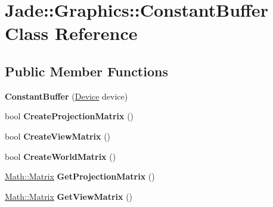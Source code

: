 \hypertarget{class_jade_1_1_graphics_1_1_constant_buffer}{}\section{Jade\+:\+:Graphics\+:\+:Constant\+Buffer Class Reference}
\label{class_jade_1_1_graphics_1_1_constant_buffer}
\subsection*{Public Member Functions}
\begin{DoxyCompactItemize}
\item 
\hypertarget{class_jade_1_1_graphics_1_1_constant_buffer_ada5823eabf51da0c466ab01f26909297}{}{\bfseries Constant\+Buffer} (\hyperlink{class_jade_1_1_graphics_1_1_device}{Device} device)\label{class_jade_1_1_graphics_1_1_constant_buffer_ada5823eabf51da0c466ab01f26909297}

\item 
\hypertarget{class_jade_1_1_graphics_1_1_constant_buffer_ae88123a27babd937c1454812d4a21cb5}{}bool {\bfseries Create\+Projection\+Matrix} ()\label{class_jade_1_1_graphics_1_1_constant_buffer_ae88123a27babd937c1454812d4a21cb5}

\item 
\hypertarget{class_jade_1_1_graphics_1_1_constant_buffer_a15679226ff228070271b91e44ae978c3}{}bool {\bfseries Create\+View\+Matrix} ()\label{class_jade_1_1_graphics_1_1_constant_buffer_a15679226ff228070271b91e44ae978c3}

\item 
\hypertarget{class_jade_1_1_graphics_1_1_constant_buffer_aa046e5121830fa71897c4e4805014ee6}{}bool {\bfseries Create\+World\+Matrix} ()\label{class_jade_1_1_graphics_1_1_constant_buffer_aa046e5121830fa71897c4e4805014ee6}

\item 
\hypertarget{class_jade_1_1_graphics_1_1_constant_buffer_a02b925d31d9a7ab4688afbf54918a740}{}\hyperlink{struct_jade_1_1_math_1_1_matrix}{Math\+::\+Matrix} {\bfseries Get\+Projection\+Matrix} ()\label{class_jade_1_1_graphics_1_1_constant_buffer_a02b925d31d9a7ab4688afbf54918a740}

\item 
\hypertarget{class_jade_1_1_graphics_1_1_constant_buffer_a5cf131c1b905c2d4bd0211a0be95dfe9}{}\hyperlink{struct_jade_1_1_math_1_1_matrix}{Math\+::\+Matrix} {\bfseries Get\+View\+Matrix} ()\label{class_jade_1_1_graphics_1_1_constant_buffer_a5cf131c1b905c2d4bd0211a0be95dfe9}


\end{DoxyCompactItemize}
